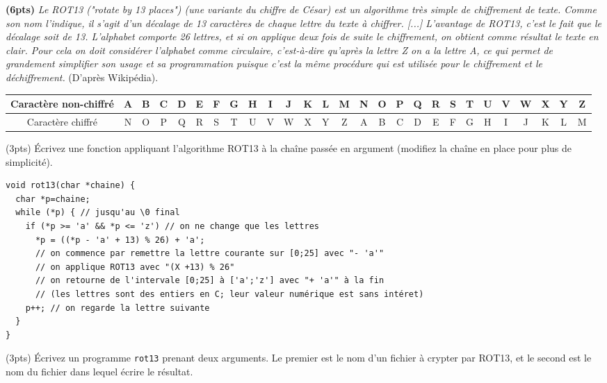 \documentclass[10pt]{article}
\begin{document}
\smallskip
\begin{Exercice}\textbf{(6pts)}
  \textit{Le ROT13 ("rotate by 13 places") (une variante du chiffre de César)
    est un algorithme très simple de chiffrement de texte. Comme son nom
    l'indique, il s'agit d'un décalage de 13 caractères de chaque lettre du
    texte à chiffrer.
%
  [...]
%
  L'avantage de ROT13, c'est le fait que le décalage soit de 13. L'alphabet
  comporte 26 lettres, et si on applique deux fois de suite le chiffrement, on
  obtient comme résultat le texte en clair. Pour cela on doit considérer
  l'alphabet comme circulaire, c'est-à-dire qu'après la lettre Z on a la lettre
  A, ce qui permet de grandement simplifier son usage et sa programmation
  puisque c'est la même procédure qui est utilisée pour le chiffrement et le
  déchiffrement.} \hfill(D'après Wikipédia).
\medskip

\hspace{-3.5em}\noindent\begin{tabular}{|c|*{26}{c@{$\,$}|}}\hline
  Caractère non-chiffré&A&B&C&D&E&F&G&H&I&J&K&L&M&N&O&P&Q&R&S&T&U&V&W&X&Y&Z\\
  \hline
  Caractère chiffré&N&O&P&Q&R&S&T&U&V&W&X&Y&Z&A&B&C&D&E&F&G&H&I&J&K&L&M\\
  \hline
\end{tabular}

\Question (3pts) Écrivez une fonction  appliquant
l'algorithme ROT13 à la chaîne passée en argument (modifiez la chaîne en place
pour plus de simplicité). 

\begin{Reponse}
  \begin{Verbatim}
void rot13(char *chaine) {
  char *p=chaine;
  while (*p) { // jusqu'au \0 final
    if (*p >= 'a' && *p <= 'z') // on ne change que les lettres
      *p = ((*p - 'a' + 13) % 26) + 'a';
      // on commence par remettre la lettre courante sur [0;25] avec "- 'a'"
      // on applique ROT13 avec "(X +13) % 26"
      // on retourne de l'intervale [0;25] à ['a';'z'] avec "+ 'a'" à la fin
      // (les lettres sont des entiers en C; leur valeur numérique est sans intéret)
    p++; // on regarde la lettre suivante
  }
}    
  \end{Verbatim}
\end{Reponse}

\Question (3pts) Écrivez un programme \texttt{rot13} prenant deux arguments. Le
premier est le nom d'un fichier à crypter par ROT13, et le second est le nom du
fichier dans lequel écrire le résultat.


\end{Exercice}
\end{document}
